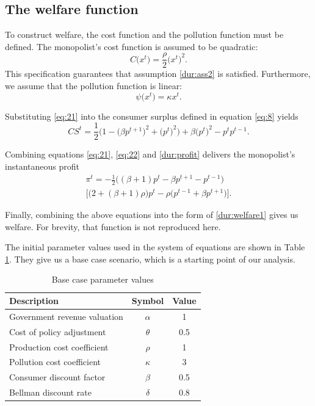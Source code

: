 \subsection{The welfare function}

\label{sec:welfare-function}

To construct welfare, the cost function and the pollution function must be
defined. The monopolist's cost function is assumed to be quadratic: 
\begin{equation}
C\big(x^{t}\big)=\frac{\rho }{2}\big(x^{t}\big)^{2}.  \label{eq:22}
\end{equation}%
This specification guarantees that assumption \ref{dur:ass2} is satisfied.
Furthermore, we assume that the pollution function is linear: 
\begin{equation}
\psi \big(x^{t}\big)=\kappa x^{t}.  \label{eq:23}
\end{equation}

Substituting \eqref{eq:21} into the consumer surplus defined in equation %
\eqref{eq:8} yields 
\begin{equation}
CS^{t}=\frac{1}{2}\Big(1-\big(\beta p^{t+1}\big)^{2}+\big(p^{t}\big)^{2}\Big)%
+\beta \big(p^{t}\big)^{2}-p^{t}p^{t-1}.  \label{eq:24}
\end{equation}

Combining equations \eqref{eq:21}, \eqref{eq:22} and \eqref{dur:profit}
delivers the monopolist's instantaneous profit 
\begin{multline}
\pi ^{t}=-\frac{1}{2}\big((\beta +1)p^{t}-\beta p^{t+1}-p^{t-1}\big)
\label{eq:25} \\
\Big[\big(2+(\beta +1)\rho \big)p^{t}-\rho \big(p^{t-1}+\beta p^{t+1}\big) %
\Big].
\end{multline}

Finally, combining the above equations into the form of \eqref{dur:welfare1}
gives us welfare. For brevity, that function is not reproduced here.

The initial parameter values used in the system of equations are shown in
Table \ref{tab:jmp_params}. They give us a base case scenario, which is a
starting point of our analysis.

\begin{table}[ht]
\centering
\begin{tabular}[h]{|l|c|c|}
\hline
\textbf{Description} & \textbf{Symbol} & \textbf{Value} \\ \hline
Government revenue valuation & $\alpha$ & 1 \\ 
Cost of policy adjustment & $\theta$ & 0.5 \\ 
Production cost coefficient & $\rho$ & 1 \\ 
Pollution cost coefficient & $\kappa$ & 3 \\ 
Consumer discount factor & $\beta$ & 0.5 \\ 
Bellman discount rate & $\delta$ & 0.8 \\ \hline
\end{tabular}%
\caption{Base case parameter values}
\label{tab:jmp_params}
\end{table}

